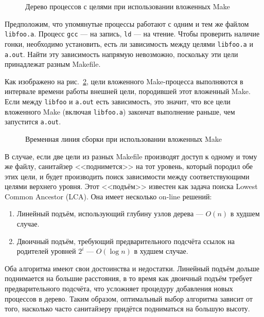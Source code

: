 \begin{figure}[H]
    \centering
    
    \caption{Дерево процессов с целями при использовании вложенных Make}
    \label{fig:nested-make-pstree-2}
\end{figure}

Предположим, что упомянутые процессы работают с одним и тем же файлом \texttt{libfoo.a}. Процесс \texttt{gcc} --- на запись, \texttt{ld} --- на чтение. Чтобы проверить наличие гонки, необходимо установить, есть ли зависимость между целями \texttt{libfoo.a} и \texttt{a.out}. Найти эту зависимость напрямую невозможно, поскольку эти цели принадлежат разным Makefile.

Как изображено на рис.~\ref{fig:nested-make-timeline}, цели вложенного Make-процесса выполняются в интервале времени работы внешней цели, породившей этот вложенный Make. Если между \texttt{libfoo} и \texttt{a.out} есть зависимость, это значит, что все цели вложенного Make (включая \texttt{libfoo.a}) закончат выполнение раньше, чем запустится \texttt{a.out}.

\begin{figure}[H]
    \centering
    
    \caption{Временная линия сборки при использовании вложенных Make}
    \label{fig:nested-make-timeline}
\end{figure}

В случае, если две цели из разных Makefile производят доступ к одному и тому же файлу, санитайзер <<поднимется>> на тот уровень, который породил обе этих цели, и будет производить поиск зависимости между соответствующими целями верхнего уровня. Этот <<подъём>> известен как задача поиска Lowest Common Ancestor (LCA). Она имеет несколько on-line решений:

\begin{enumerate}
    \item Линейный подъём, использующий глубину узлов дерева --- $O(n)$ в худшем случае.
    \item Двоичный подъём, требующий предварительного подсчёта ссылок на родителей уровней $2^i$ --- $O(\log{n})$ в худшем случае.
\end{enumerate}

Оба алгоритма имеют свои достоинства и недостатки. Линейный подъём дольше поднимается на большие расстояния, в то время как двоичный подъём требует предварительного подсчёта, что усложняет процедуру добавления новых процессов в дерево. Таким образом, оптимальный выбор алгоритма зависит от того, насколько часто санитайзеру придётся подниматься на большую высоту.

